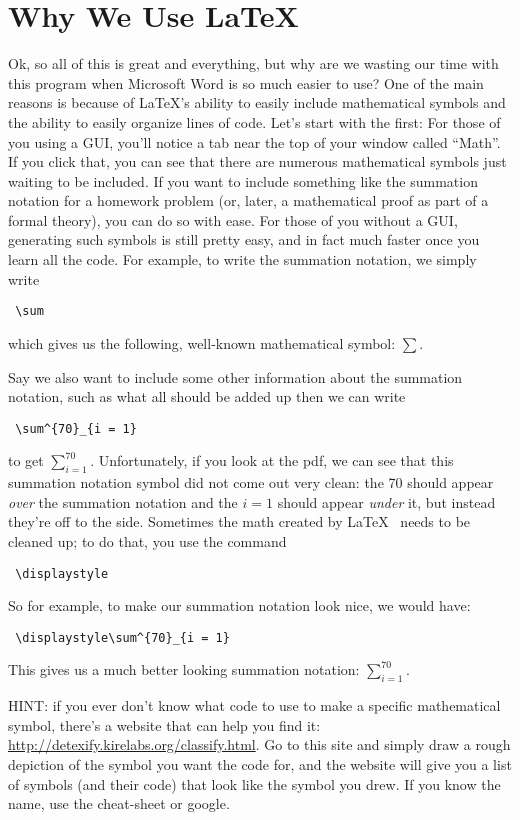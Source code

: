 \documentclass{article}
\begin{document}
\section*{Why We Use \LaTeX}
Ok, so all of this is great and everything, but why are we wasting our time with this program when Microsoft Word is so much easier to use? One of the main reasons is because of \LaTeX's ability to easily include mathematical symbols and the ability to easily organize lines of code. Let's start with the first: 
For those of you using a GUI, you'll notice a tab near the top of your window called ``Math''. If you click that, you can see that there are numerous mathematical symbols just waiting to be included. If you want to include something like the summation notation for a homework problem (or, later, a mathematical proof as part of a formal theory), you can do so with ease. For those of you without a GUI, generating such symbols is still pretty easy, and in fact much faster once you learn all the code. For example, to write the summation notation, we simply write \begin{verbatim} \sum \end{verbatim} which gives us the following, well-known mathematical symbol: $\sum$.

Say we also want to include some other information about the summation notation, such as what all should be added up then we can write \begin{verbatim} \sum^{70}_{i = 1} \end{verbatim}
to get $\sum^{70}_{i = 1}$. Unfortunately, if you look at the pdf, we can see that this summation notation symbol did not come out very clean: the 70 should appear \textit{over} the summation notation and the $i = 1$ should appear \textit{under} it, but instead they're off to the side. Sometimes the math created by \LaTeX~ needs to be cleaned up; to do that, you use the command \begin{verbatim} \displaystyle \end{verbatim} So for example, to make our summation notation look nice, we would have: \begin{verbatim} \displaystyle\sum^{70}_{i = 1} \end{verbatim} This gives us a much better looking summation notation: $\displaystyle\sum^{70}_{i = 1}$. 

HINT: if you ever don't know what code to use to make a specific mathematical symbol, there's a website that can help you find it: \url{http://detexify.kirelabs.org/classify.html}. Go to this site and simply draw a rough depiction of the symbol you want the code for, and the website will give you a list of symbols (and their code) that look like the symbol you drew. If you know the name, use the cheat-sheet or google.
\end{document}
